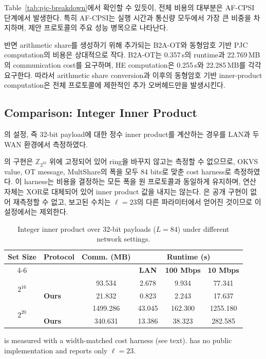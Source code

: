 \documentclass[sigconf,anonymous,review]{acmart}
\newcommand{\Z}{\mathbb{Z}}
\begin{document}
Table~\ref{tab:pjc-breakdown}에서 확인할 수 있듯이,
전체 비용의 대부분은 AF-CPSI 단계에서 발생한다.
특히 AF-CPSI는 실행 시간과 통신량 모두에서 가장 큰 비중을
차지하며, 제안 프로토콜의 주요 성능 병목으로 나타난다.

반면 arithmetic share를 생성하기 위해 추가되는 B2A-OT와
동형암호 기반 PJC computation의 비용은 상대적으로 작다.
B2A-OT는 0.357\,s의 runtime과 22.769\,MB의 communication cost를
요구하며, HE computation은 0.255\,s와 22.285\,MB를 각각 요구한다.
따라서 arithmetic share conversion과 이후의 동형암호 기반
inner-product computation은 전체 프로토콜에 제한적인
추가 오버헤드만을 발생시킨다.

\subsection{Comparison: Integer Inner Product}
\label{sec:integer-ip-exp}
의 설정, 즉 32-bit payload에 대한 정수 inner product를
계산하는 경우를 LAN과 두 WAN 환경에서 측정하였다.

\cite{KLS26}의 구현은 $\Z_{2^{32}}$ 위에
고정되어 있어 ring을 바꾸지 않고는 측정할 수 없으므로, OKVS value, OT message,
MultShare의 폭을 모두 84 bits로 맞춘 cost harness로 측정하였다. 이 harness는
비용을 결정하는 모든 폭을 원 프로토콜과 동일하게 유지하며, 연산 자체는
XOR로 대체되어 있어 inner product 값을 내지는 않는다.
\cite{CHI+23}은 공개 구현이 없어 재측정할 수 없고, 보고된 수치는
$\ell=23$의 다른 파라미터에서 얻어진 것이므로 이 설정에서는 제외한다.

\begin{table}[h]
\centering
\caption{Integer inner product over 32-bit payloads ($L=84$) under different network settings.}
\label{tab:pjc-long}
\setlength{\tabcolsep}{6pt}
\renewcommand{\arraystretch}{1.05}
\small
\begin{tabular}{c l c c c c}
\toprule
\multirow{2}{*}{\textbf{Set Size}} & \multirow{2}{*}{\textbf{Protocol}} & \multirow{2}{*}{\textbf{Comm. (MB)}} & \multicolumn{3}{c}{\textbf{Runtime (s)}} \\
\cmidrule(lr){4-6}
& & & \textbf{LAN} & \textbf{100 Mbps} & \textbf{10 Mbps} \\
\midrule
\multirow{2}{*}{$2^{16}$}
& \cite{KLS26} & 93.534 & 2.678 & 9.934 & 77.341 \\
& \textbf{Ours} & 21.832 & 0.823 & 2.243 & 17.637 \\
\midrule
\multirow{2}{*}{$2^{20}$}
& \cite{KLS26} & 1499.286 & 43.045 & 162.300 & 1255.180 \\
& \textbf{Ours} & 340.631 & 13.386 & 38.323 & 282.585 \\
\bottomrule
\end{tabular}
\vspace{2pt}
\begin{minipage}{0.95\linewidth}
\footnotesize
\cite{KLS26} is measured with a width-matched cost harness (see text).
\cite{CHI+23} has no public implementation and reports only $\ell=23$.
\end{minipage}
\end{table}
\end{document}
